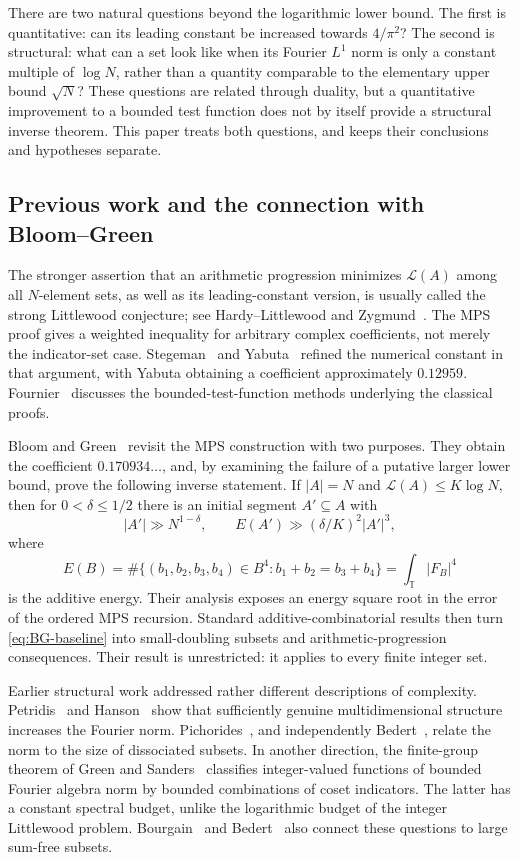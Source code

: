 \documentclass[11pt,reqno]{amsart}
\numberwithin{equation}{section}
\theoremstyle{definition}
\theoremstyle{remark}
\newcommand{\T}{\mathbb T}
\newcommand{\La}{\mathcal L}
\begin{document}
There are two natural questions beyond the logarithmic lower bound. The
first is quantitative: can its leading constant be increased towards
$4/\pi^2$? The second is structural: what can a set look like when its
Fourier $L^1$ norm is only a constant multiple of $\log N$, rather than a
quantity comparable to the elementary upper bound $\sqrt N$? These
questions are related through duality, but a quantitative improvement to
a bounded test function does not by itself provide a structural inverse
theorem. This paper treats both questions, and keeps their conclusions
and hypotheses separate.

\subsection{Previous work and the connection with Bloom--Green}

The stronger assertion that an arithmetic progression minimizes $\La(A)$
among all $N$-element sets, as well as its leading-constant version, is
usually called the strong Littlewood conjecture; see Hardy--Littlewood
\cite{HardyLittlewood} and Zygmund~\cite{Zygmund}. The MPS proof gives a
weighted inequality for arbitrary complex coefficients, not merely the
indicator-set case. Stegeman~\cite{Stegeman} and Yabuta~\cite{Yabuta}
refined the numerical constant in that argument, with Yabuta obtaining a
coefficient approximately $0.12959$. Fournier~\cite{Fournier} discusses the
bounded-test-function methods underlying the classical proofs.

Bloom and Green~\cite{BG} revisit the MPS construction with two purposes.
They obtain the coefficient $0.170934\ldots$, and, by examining the
failure of a putative larger lower bound, prove the following inverse
statement. If $|A|=N$ and $\La(A)\le K\log N$, then for
$0<\delta\le1/2$ there is an initial segment $A'\subseteq A$ with
\begin{equation}\label{eq:BG-baseline}
 |A'|\gg N^{1-\delta},\qquad
 E(A')\gg(\delta/K)^2|A'|^3,
\end{equation}
where
\[
 E(B)=\#\{(b_1,b_2,b_3,b_4)\in B^4:b_1+b_2=b_3+b_4\}
     =\int_{\T}|F_B|^4
\]
is the additive energy. Their analysis exposes an energy square root in
the error of the ordered MPS recursion. Standard additive-combinatorial
results then turn \eqref{eq:BG-baseline} into small-doubling subsets and
arithmetic-progression consequences. Their result is unrestricted: it
applies to every finite integer set.

Earlier structural work addressed rather different descriptions of
complexity. Petridis~\cite{Petridis} and Hanson~\cite{Hanson} show that
sufficiently genuine multidimensional structure increases the Fourier
norm. Pichorides~\cite{Pichorides}, and independently Bedert~\cite{Bedert},
relate the norm to the size of dissociated subsets. In another direction,
the finite-group theorem of Green and Sanders~\cite{GreenSanders}
classifies integer-valued functions of bounded Fourier algebra norm by
bounded combinations of coset indicators. The latter has a constant
spectral budget, unlike the logarithmic budget of the integer
Littlewood problem. Bourgain~\cite{Bourgain} and Bedert~\cite{Bedert}
also connect these questions to large sum-free subsets.
\end{document}
